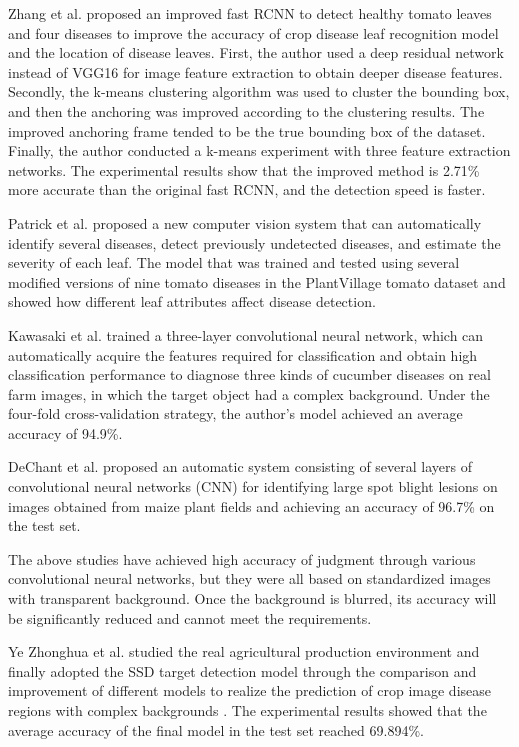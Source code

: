 \documentclass[a4paper,fleqn]{cas-sc}
\begin{document}
Zhang et al. proposed an improved fast RCNN to detect healthy tomato leaves and four diseases to improve the accuracy of crop disease leaf recognition model and the location of disease leaves\citep{zhang2020deep}. First, the author used a deep residual network instead of VGG16 for image feature extraction to obtain deeper disease features. Secondly, the k-means clustering algorithm was used to cluster the bounding box, and then the anchoring was improved according to the clustering results. The improved anchoring frame tended to be the true bounding box of the dataset. Finally, the author conducted a k-means experiment with three feature extraction networks. The experimental results show that the improved method is 2.71\% more accurate than the original fast RCNN, and the detection speed is faster.

Patrick et al. \citep{wspanialy2020detection} proposed a new computer vision system that can automatically identify several diseases, detect previously undetected diseases, and estimate the severity of each leaf. The model that was trained and tested using several modified versions of nine tomato diseases in the PlantVillage tomato dataset and showed how different leaf attributes affect disease detection.

Kawasaki et al. \citep{kawasaki2015basic} trained a three-layer convolutional neural network, which can automatically acquire the features required for classification and obtain high classification performance to diagnose three kinds of cucumber diseases on real farm images, in which the target object had a complex background. Under the four-fold cross-validation strategy, the  author's model achieved an average accuracy of 94.9\%.

DeChant et al. \citep{dechant2017automated} proposed an automatic system consisting of several layers of convolutional neural networks (CNN) for identifying large spot blight lesions on images obtained from maize plant fields and achieving an accuracy of 96.7\% on the test set.

The above studies have achieved high accuracy of judgment through various convolutional neural networks, but they were all based on standardized images with transparent background. Once the background is blurred, its accuracy will be significantly reduced and cannot meet the requirements. 

Ye Zhonghua et al. studied the real agricultural production environment and finally adopted the SSD target detection model through the comparison and improvement of different models to realize the prediction of crop image disease regions with complex backgrounds \citep{YeZhonghua}. The experimental results showed that the average accuracy of the final model in the test set reached 69.894\%.
\end{document}
